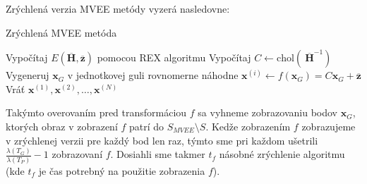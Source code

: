 Zrýchlená verzia MVEE metódy vyzerá nasledovne:

\begin{algorithm}[H]
	\caption{Zrýchlená MVEE metóda}
	\label{zrychlene_MVEE}
	\begin{algorithmic}[1]
		\State Vypočítaj $E(\mathbf{\overline H, \overline z})$ pomocou REX algoritmu
		\State Vypočítaj $C \leftarrow \text{chol}(\: \mathbf{\overline H}^{-1})$
			\Repeat
			\State Vygeneruj $\mathbf x_G$ v jednotkovej guli rovnomerne náhodne
			\State $\mathbf x^{(i)} \leftarrow f(\mathbf x_G) = C\mathbf x_G+ \mathbf{\overline z}$
		\EndFor
		\State Vráť ${\mathbf x^{(1)},\mathbf x^{(2)},\dots,\mathbf x^{(N)}}$
	\end{algorithmic}
\end{algorithm}

Takýmto overovaním pred transformáciou $f$ sa vyhneme zobrazovaniu bodov $\mathbf x_G$, ktorých obraz v zobrazení $f$ patrí do $S_{MVEE} \setminus S$. Kedže zobrazením $f$ zobrazujeme v zrýchlenej verzii pre každý bod len raz, týmto sme pri každom ušetrili $ \frac{\lambda(T_G)}{\lambda(T_P)} -1$ zobrazovaní $f$. Dosiahli sme takmer $t_f$ násobné zrýchlenie algoritmu (kde $t_f$ je čas potrebný na použitie zobrazenia $f$).
